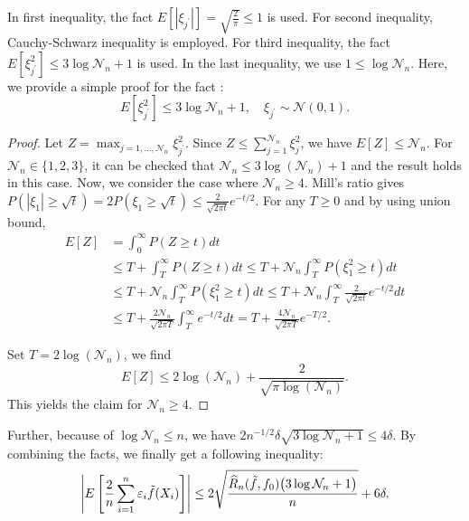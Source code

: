\documentclass{article}
\theoremstyle{definition}
\begin{document}
In first inequality, the fact $E[|\xi_{j^{'}}|]=\sqrt{\frac{2}{\pi}}\leq 1$ is used. 
For second inequality, Cauchy-Schwarz inequality is employed.
For third inequality, the fact $E[\xi_{j^{'}}^{2}]\leq 3\log\mathcal{N}_{n}+1$ is used. 
In the last inequality, we use $1\leq \log\mathcal{N}_{n}$. 
Here, we provide a simple proof for the fact :
\begin{equation*}
    E[\xi_{j^{'}}^{2}]\leq 3\log\mathcal{N}_{n}+1, \quad \xi_{j^{'}}\sim\mathcal{N}(0,1).
\end{equation*}

\begin{proof}
    Let $Z=\max_{j=1,\dots,\mathcal{N}_{n}}\xi_{j^{'}}^{2}$. 
    Since $Z\leq\sum_{j=1}^{\mathcal{N}_{n}}\xi_{j}^{2}$, we have $E[Z]\leq \mathcal{N}_{n}$.   
    For $\mathcal{N}_{n}\in\{1,2,3\}$, it can be checked that $\mathcal{N}_{n}\leq3\log(\mathcal{N}_{n})+1$ and the result holds in this case. 
    Now, we consider the case where $\mathcal{N}_{n}\geq4$.
    Mill's ratio gives $P(|\xi_{1}|\geq\sqrt{t})=2P(\xi_{1}\geq\sqrt{t})\leq\frac{2}{\sqrt{2\pi t}}e^{-t/2}$.
    For any $T\geq0$ and by using union bound, 
    \begin{align*}
        E[Z]
        &=\int_{0}^{\infty}P(Z\geq t)dt\\
        &\leq T + \int_{T}^{\infty}P(Z\geq t)dt
        \leq T + \mathcal{N}_{n}\int_{T}^{\infty}P(\xi_{1}^{2} \geq t)dt\\
        &\leq T + \mathcal{N}_{n}\int_{T}^{\infty}P(\xi_{1}^{2} \geq t)dt
        \leq T + \mathcal{N}_{n}\int_{T}^{\infty}\frac{2}{\sqrt{2\pi t}}e^{-t/2}dt\\
        &\leq T + \frac{2\mathcal{N}_{n}}{\sqrt{2\pi T}} \int_{T}^{\infty}e^{-t/2}dt
        = T + \frac{4\mathcal{N}_{n}}{\sqrt{2\pi T}}e^{-T/2}.
    \end{align*}
    
    Set $T=2\log(\mathcal{N}_{n})$, we find
    \begin{equation*}
        E[Z]\leq 2\log(\mathcal{N}_{n})+\frac{2}{\sqrt{\pi\log(\mathcal{N}_{n})}}.
    \end{equation*}
    This yields the claim for $\mathcal{N}_{n}\geq4$.
\end{proof}


Further, because of $\log\mathcal{N}_{n}\leq n$, we have $2n^{-1/2}\delta\sqrt{3\log\mathcal{N}_{n}+1}\leq 4\delta$. By combining the facts, we finally get a following inequality:
\begin{eqnarray*}
    \left| E\left[ \frac{2}{n}\sum_{i=1}^{n} \varepsilon_{i}\Tilde{f}(X_{i}) \right] \right| 
    \leq 2\sqrt{\frac{\widehat{R}_{n}(\Tilde{f},f_{0})\big( 3\log\mathcal{N}_{n}+1 \big)}{n}}+6\delta.
\end{eqnarray*}
\end{document}
